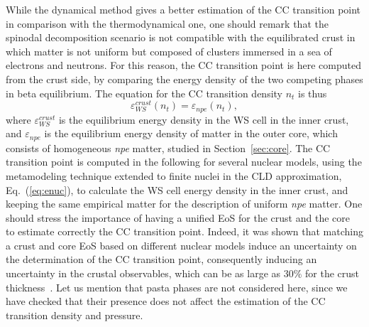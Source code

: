 While the dynamical method gives a better estimation of the CC transition point
in comparison with the thermodynamical one, one should remark that the spinodal
decomposition scenario is not compatible with the equilibrated crust in which
matter is not uniform but composed of clusters immersed in a sea of electrons
and neutrons. For this reason, the CC transition point is here computed from 
the crust side, by comparing the energy density of the two competing phases in 
beta equilibrium. The equation for the CC transition density $n_t$ is thus
%
\begin{equation}
  \varepsilon_{WS}^{crust}(n_t) = \varepsilon_{npe}(n_t),\label{eq:cctp}
\end{equation}
%
where $\varepsilon_{WS}^{crust}$ is the equilibrium energy density in the WS
cell in the inner crust, and $\varepsilon_{npe}$ is the equilibrium energy
density of matter in the outer core, which consists of homogeneous \textit{npe} 
matter, studied in Section~\ref{sec:core}.
The CC transition point is computed in the following for several nuclear 
models, using the metamodeling technique extended to finite nuclei in the 
CLD approximation, Eq.~(\ref{eq:enuc}), to calculate the WS cell energy density in 
the inner crust, and keeping the same empirical matter for the description of 
uniform \textit{npe} matter. One should stress the importance of having a 
unified EoS for the crust and the core~\cite{Douchin2001} to estimate correctly 
the CC transition point. Indeed, it was shown that matching a crust and core
EoS based on different nuclear models induce an uncertainty on the determination 
of the CC transition point, consequently inducing an uncertainty in the crustal 
observables, which can be as large as $30\%$ for the crust
thickness~\cite{Fortin2016}. 
Let us mention that pasta phases are not 
considered here, since we have checked that their presence does not 
affect the estimation of the CC transition density and pressure.


